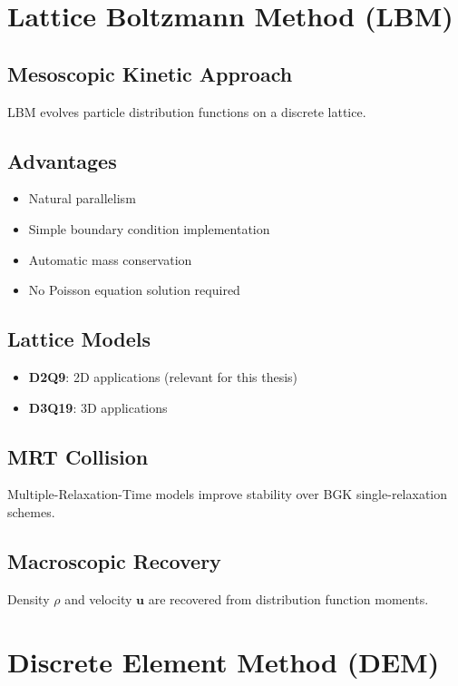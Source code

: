 \section{Lattice Boltzmann Method (LBM)}

\subsection{Mesoscopic Kinetic Approach}
LBM evolves particle distribution functions on a discrete lattice.

\subsection{Advantages}
\begin{itemize}
    \item Natural parallelism
    \item Simple boundary condition implementation
    \item Automatic mass conservation
    \item No Poisson equation solution required
\end{itemize}

\subsection{Lattice Models}
\begin{itemize}
    \item \textbf{D2Q9}: 2D applications (relevant for this thesis)
    \item \textbf{D3Q19}: 3D applications
\end{itemize}

\subsection{MRT Collision}
Multiple-Relaxation-Time models improve stability over BGK single-relaxation schemes.

\subsection{Macroscopic Recovery}
Density $\rho$ and velocity $\mathbf{u}$ are recovered from distribution function moments.

\section{Discrete Element Method (DEM)}

